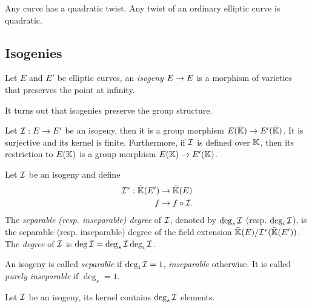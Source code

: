 \begin{proposition}
  Any curve has a quadratic twist. Any twist of an ordinary elliptic
  curve is quadratic.
\end{proposition}


\subsection{Isogenies}
\label{sec:isogenies}

\begin{definition}[Isogeny]
  Let $E$ and $E'$ be elliptic curves, an
  \emph{isogeny} $E\rightarrow E$ is a morphism of varieties
  that preserves the point at infinity.
\end{definition}

It turns out that isogenies preserve the group structure.

\begin{theorem}
  Let $\mathcal{I}:E\rightarrow E'$ be an isogeny, then it is a group morphism
  $E(\bar{\mathbb{K}})\rightarrow E'(\bar{\mathbb{K}})$. It is surjective and its kernel is
  finite. Furthermore, if $\mathcal{I}$ is defined over $\mathbb{K}$, then its
  restriction to $E(\mathbb{K})$ is a group morphism $E(\mathbb{K})\rightarrow E'(\mathbb{K})$.
\end{theorem}

\begin{definition}[Degree]
  Let $\mathcal{I}$ be an isogeny and
  define
  \begin{equation}
    \label{eq:138}
    \begin{aligned}
      \mathcal{I}^\ast:\bar{\mathbb{K}}(E')&\rightarrow\bar{\mathbb{K}}(E)\\
      f &\rightarrow f\circ\mathcal{I}
      \text{.}
    \end{aligned}
  \end{equation}
  The \emph{separable (resp. inseparable) degree} of $\mathcal{I}$, denoted by
  $\deg_s\mathcal{I}$ (resp. $\deg_i\mathcal{I}$), is the separable (resp. inseparable)
  degree of the field extension
  $\bar{\mathbb{K}}(E)/\mathcal{I}^\ast(\bar{\mathbb{K}}(E'))$. The \emph{degree} of $\mathcal{I}$
  is $\deg\mathcal{I}=\deg_s\mathcal{I}\deg_i\mathcal{I}$.

  An isogeny is called \emph{separable} if
  $\deg_i\mathcal{I}=1$, \emph{inseparable}
  otherwise. It is called
  \emph{purely inseparable} if
  $\deg_s=1$.
\end{definition}

\begin{theorem}
  Let $\mathcal{I}$ be an isogeny, its kernel contains $\deg_s\mathcal{I}$ elements.
\end{theorem}

